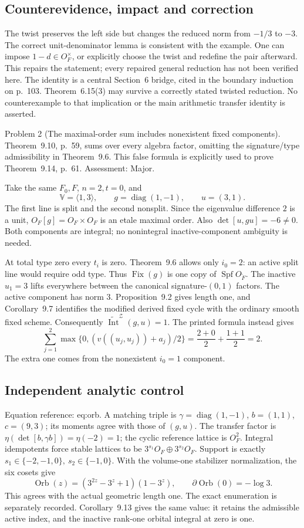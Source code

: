 \documentclass[10pt]{article}
\begin{document}
\subsection*{Counterevidence, impact and correction}
The twist preserves the left side but changes the reduced norm from \(-1/3\) to \(-3\). The correct unit-denominator lemma is consistent with the example. One can impose \(1-d\in O_F^\times\), or explicitly choose the twist and redefine the pair afterward. This repairs the statement; every repaired general reduction has not been verified here. The identity is a central Section 6 bridge, cited in the boundary induction on p. 103. Theorem 6.15(3) may survive a correctly stated twisted reduction. No counterexample to that implication or the main arithmetic transfer identity is asserted.\par
Problem 2 (The maximal-order sum includes nonexistent fixed components).  Theorem 9.10, p. 59, sums over every algebra factor, omitting the signature/type admissibility in Theorem 9.6. This false formula is explicitly used to prove Theorem 9.14, p. 61. Assessment: Major.\par
Take the same \(F_0,F\), \(n=2,t=0\), and \[\mathbb V=\langle1,3\rangle,\qquad
 g=\operatorname{diag}(1,-1),\qquad u=(3,1).\] The first line is split and the second nonsplit. Since the eigenvalue difference \(2\) is a unit, \(O_F[g]=O_F\times O_F\) is an etale maximal order. Also \(\det[u,gu]=-6\ne0\). Both components are integral; no nonintegral inactive-component ambiguity is needed.\par
At total type zero every \(t_i\) is zero. Theorem 9.6 allows only \(i_0=2\): an active split line would require odd type. Thus \(\operatorname{Fix}(g)\) is one copy of \(\operatorname{Spf}O_{\breve F}\). The inactive \(u_1=3\) lifts everywhere between the canonical signature-\((0,1)\) factors. The active component has norm \(3\). Proposition 9.2 gives length one, and Corollary 9.7 identifies the modified derived fixed cycle with the ordinary smooth fixed scheme. Consequently \(\widetilde{\operatorname{Int}}^{\mathcal Z}(g,u)=1\). The printed formula instead gives \[\sum_{j=1}^{2}\max\{0,(v((u_j,u_j))+a_j)/2\}
 =\frac{2+0}{2}+\frac{1+1}{2}=2.\] The extra one comes from the nonexistent \(i_0=1\) component.\par
\subsection*{Independent analytic control}
Equation reference: eq:orb. A matching triple is \(\gamma=\operatorname{diag}(1,-1)\), \(b=(1,1)\), \(c=(9,3)\); its moments agree with those of \((g,u)\). The transfer factor is \(\eta(\det[b,\gamma b])=\eta(-2)=1\); the cyclic reference lattice is \(O_F^2\). Integral idempotents force stable lattices to be \(3^{s_1}O_F\oplus3^{s_2}O_F\). Support is exactly \(s_1\in\{-2,-1,0\},\ s_2\in\{-1,0\}\). With the volume-one stabilizer normalization, the six cosets give \[
 \operatorname{Orb}(z)=(3^{2z}-3^z+1)(1-3^z),\qquad
 \partial\operatorname{Orb}(0)=-\log3.\] This agrees with the actual geometric length one. The exact enumeration is separately recorded. Corollary 9.13 gives the same value: it retains the admissible active index, and the inactive rank-one orbital integral at zero is one.\par
\end{document}
